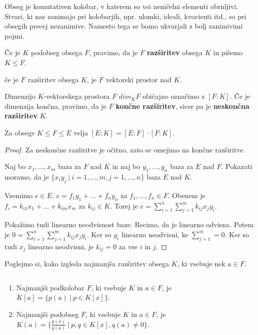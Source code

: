 \documentclass[11pt, a4paper]{article}
\begin{document}
    Obseg je komutativen kolobar, v katerem so vsi neničelni elementi obrnljivi. Stvari, ki nas zanimajo pri kolobarjih, npr. ulomki, ideali, kvocienti itd., so pri obsegih precej nezanimive. Namesto tega se bomo ukvarjali z bolj zanimivimi pojmi.

    \begin{definition}
        Če je \(K\) podobseg obsega \(F\), pravimo, da je \(F\) \textbf{razširitev} obsega \(K\) in pišemo \(K \le F\).
    \end{definition}

    \begin{proposition}
        če je \(F\) razširitev obsega \(K\), je \(F\) vektorski prostor nad \(K\).
    \end{proposition}

    Dimenzijo \(K\)-vektorskega prostora \(F\) \(dim_{K}F\) običajno označimo z \([F:K]\). Če je dimenzija končna, pravimo, da je \(F\) \textbf{končne razširitev}, sicer pa je \textbf{neskončna razširitev} \(K\).

    \begin{theorem}
        Za obsege \(K \le F \le E\) velja \([E:K] = [E:F] \cdot [F:K]\).
    \end{theorem}

    \begin{proof}
        Za neskončne razširitve je očitno, zato se omejimo na končne razširitve.
        \par
        Naj bo \(x_1,...,x_m\) baza za \(F\) nad \(K\) in naj bo \(y_1,...,y_n\) baza za \(E\) nad \(F\). Pokazati moramo, da je \(\{x_i y_j\ |\ i = 1,...,m, j = 1,...,n\}\) baza \(E\) nad \(K\).
        \par
        Vzemimo \(e \in E\). \(e = f_1 y_1 + ... + f_n y_n\) za \(f_1,...,f_n \in F\). Obenem je \(f_i = k_{i1} x_1 + ... + k_{im} x_m\) za \(k_{ij} \in K\). Torej je \(e = \sum_{i = 1}^n \sum_{j = 1}^m k_{ij} x_j y_i\).
        \par
        Pokažimo tudi linearno neodvisnost baze. Recimo, da je linearno odvisna. Potem je \(0 = \sum_{i = 1}^n \sum_{j = 1}^m k_{ij} x_j y_i\). Ker so \(y_i\) linearno neodvisni, ke \(\sum_{j = 1}^m = 0\). Ker so tudi \(x_j\) linearno neodvisni, je \(k_{ij} = 0\) za vse \(i\) in \(j\). 
    \end{proof}

    Poglejmo si, kako izgleda najmanjša razširitev obsega \(K\), ki vsebuje nek \(a \in F\).
    
    \begin{proposition}
        \(\)\par
        \begin{enumerate}[label=\alph*)]
            \item Najmanjši podkolobar \(F\), ki vsebuje \(K\) in \(a \in F\), je \(K[a] = \{p(a)\ |\ p \in K[x]\}\).
            \item Najmanjši podobseg \(F\), ki vsebuje \(K\) in \(a \in F\), je \(K(a) = \{\frac{p(a)}{q(a)}\ |\ p,q \in K[x], q(a) \neq 0\}\).
        \end{enumerate}
    \end{proposition}
\end{document}

